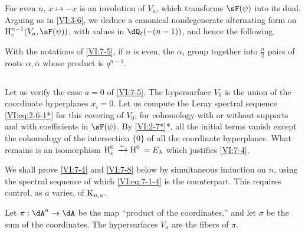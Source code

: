 For even $n$, $x\mapsto -x$ is an involution of $V_a$, which transforms 
$\sF(\psi)$ into its dual. Arguing as in \ref{VI:3-6}, we deduce a 
canonical nondegenerate alternating form on $\h_c^{n-1}(V_a,\sF(\psi))$, 
with values in $\dQ_\ell(-(n-1))$, and hence the following. 





\begin{corollary_}\label{VI:7-6}
With the notations of \ref{VI:7-5}, if $n$ is even, the $\alpha_i$ group together 
into $\frac n 2$ pairs of roots $\alpha,\bar\alpha$ whose product is 
$q^{n-1}$. 
\end{corollary_}





\subsection{}\label{VI:7-7}

Let us verify the case $a=0$ of \ref{VI:7-5}. The hypersurface $V_0$ is the union 
of the coordinate hyperplanes $x_i=0$. Let us compute the Leray spectral sequence 
\eqref{VI:eq:2-6-1*} for this covering of $V_0$, for cohomology with or 
without supports and with coefficients in $\sF(\psi)$. By \ref{VI:2-7*}*, all 
the initial terms vanish except the cohomology of the intersection $\{0\}$ of 
all the coordinate hyperplanes. What remains is an isomorphism 
$\operatorname{H}_c^0{}\xrightarrow\sim \operatorname{H}^0{}=E_\lambda$ which justifies \ref{VI:7-4}. 

We shall prove \ref{VI:7-4} and \ref{VI:7-8} below by simultaneous induction 
on $n$, using the spectral sequence of which 
\eqref{VI:eq:7-1-4} is the counterpart. This requires control, as $a$ varies, 
of $\textnormal{K}_{n,a}$. 

Let $\pi:\dA^n \to \dA$ be the map ``product of the coordinates,'' and let 
$\sigma$ be the sum of the coordinates. The hypersurfaces $V_a$ are the fibers of 
$\pi$.





